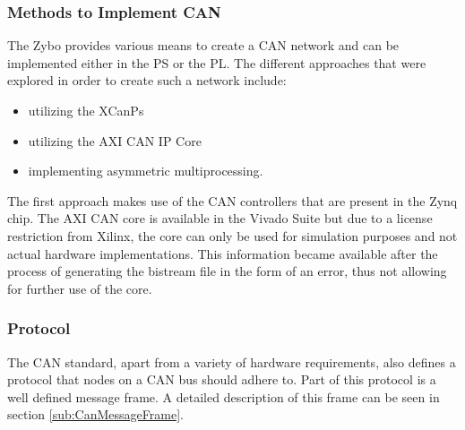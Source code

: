 \subsubsection*{Methods to Implement CAN}
The Zybo provides various means to create a CAN network and can be implemented either in the PS or the PL.
The different approaches that were explored in order to create such a network include:
\begin{itemize}
\item utilizing the XCanPs
\item utilizing the AXI CAN IP Core
\item implementing asymmetric multiprocessing.
\end{itemize}
The first approach makes use of the CAN controllers that are present in the Zynq chip.
The AXI CAN core is available in the Vivado Suite but due to a license restriction from Xilinx, the core can only be used for simulation purposes and not actual hardware implementations.
This information became available after the process of generating the bistream file in the form of an error, thus not allowing for further use of the core.

\subsubsection*{Protocol}
The CAN standard, apart from a variety of hardware requirements, also defines a protocol that nodes on a CAN bus should adhere to.
Part of this protocol is a well defined message frame.
A detailed description of this frame can be seen in section \ref{sub:CanMessageFrame}.\\

